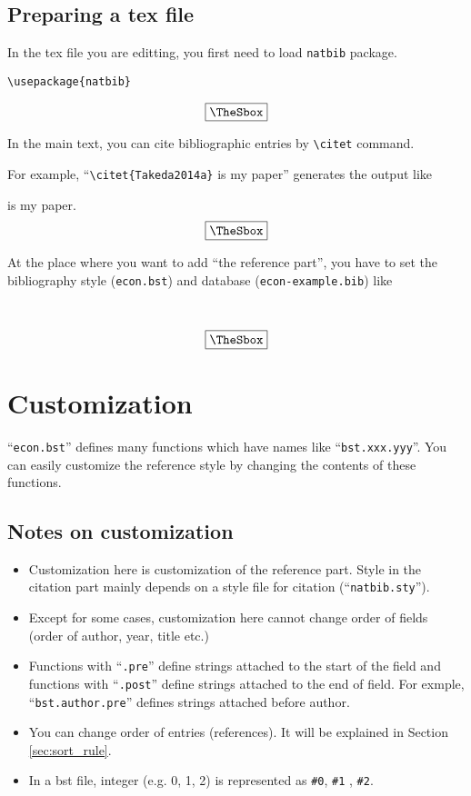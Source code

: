 \documentclass[10pt]{article}
\newenvironment{Frame}%
{\setlength{\fboxsep}{15pt}
\setlength{\mylength}{\linewidth}%
\addtolength{\mylength}{-2\fboxsep}%
\addtolength{\mylength}{-2\fboxrule}%
\Sbox
\minipage{\mylength}%
\setlength{\abovedisplayskip}{0pt}%
\setlength{\belowdisplayskip}{0pt}%
}%
{\endminipage\endSbox
\[\fbox{\TheSbox}\]}
\begin{document}
\subsection{Preparing a tex file}

In the tex file you are editting, you first need to load \texttt{natbib}
package.
\begin{Frame}
\begin{verbatim}
\usepackage{natbib}
\end{verbatim}
\end{Frame}

In the main text, you can cite bibliographic entries by \verb|\citet|
command.

For example, ``\verb|\citet{Takeda2014a}| is my paper'' generates the output like
\begin{Frame}
\citet{Takeda2014a} is my paper.
\end{Frame}

At the place where you want to add ``the reference part'', you have to set the
bibliography style (\texttt{econ.bst}) and database (\texttt{econ-example.bib}) like
\begin{Frame}
\begin{verbatim}


\end{verbatim}
\end{Frame}


\section{Customization}

``\texttt{econ.bst}'' defines many functions which have names like
``\texttt{bst.xxx.yyy}''.  You can easily customize the reference style by
changing the contents of these functions.

\subsection{Notes on customization}

\begin{itemize}
 \item Customization here is customization of the reference part.  Style
       in the citation part mainly depends on a style file for citation
       (``\texttt{natbib.sty}'').
 \item Except for some cases, customization here cannot change order
       of fields (order of author, year, title etc.)
 \item Functions with ``\texttt{.pre}'' define strings attached to the start
       of the field and functions with ``\texttt{.post}'' define strings
       attached to the end of field.  For exmple,
       ``\texttt{bst.author.pre}'' defines strings attached before author.
 \item You can change order of entries (references).  It will be
       explained in Section \ref{sec:sort_rule}.
 \item In a bst file, integer (e.g. 0, 1, 2) is represented as \verb|#0|, \verb|#1| , \verb|#2|.
\end{itemize}
\end{document}
